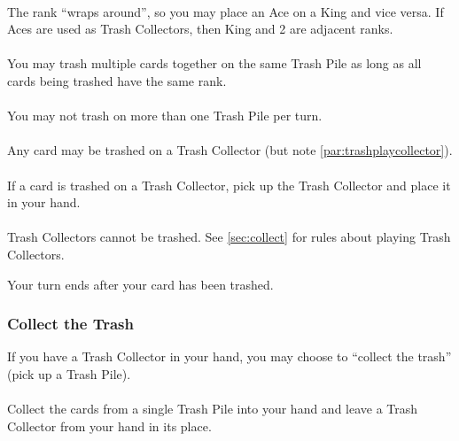 \documentclass{article}
\begin{document}
\paragraph{\label{par:trashwraparound}}
The rank ``wraps around'', so you may place an Ace on a King and vice versa. If Aces are used as Trash Collectors, then King and 2 are adjacent ranks.

\paragraph{\label{par:trashmultiple}}
You may trash multiple cards together on the same Trash Pile as long as all cards being trashed have the same rank.

\paragraph{\label{par:trashmultiplepiles}}
You may not trash on more than one Trash Pile per turn.

\paragraph{\label{par:trashwild}}
Any card may be trashed on a Trash Collector (but note \autoref{par:trashplaycollector}).

\paragraph{\label{par:trashplayoncollector}}
If a card is trashed on a Trash Collector, pick up the Trash Collector and place it in your hand.

\paragraph{\label{par:trashplaycollector}}
Trash Collectors cannot be trashed. See \autoref{sec:collect} for rules about playing Trash Collectors.

Your turn ends after your card has been trashed.

\subsubsection{Collect the Trash \label{sec:collect}}

If you have a Trash Collector in your hand, you may choose to ``collect the trash'' (pick up a Trash Pile).

\paragraph{\label{par:collectplay}}
Collect the cards from a single Trash Pile into your hand and leave a Trash Collector from your hand in its place.
\end{document}
